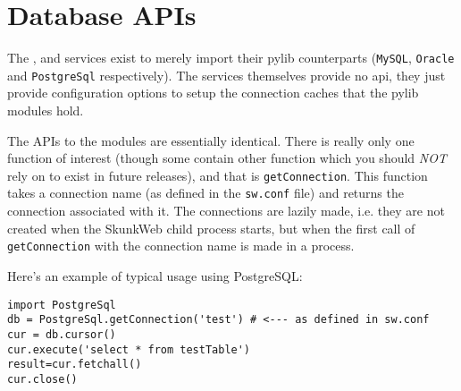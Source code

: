 \documentclass{manual}
\begin{document}
%
%
%
%
%
%
%
%
%
%
%
%
%
%
%
%
%
%
%
\appendix


\chapter{Database APIs}
\label{Database APIs}

The ,  and 
services exist to merely import their pylib counterparts
(\texttt{MySQL}, \texttt{Oracle} and \texttt{PostgreSql}
respectively).  The services themselves provide no api, they just
provide configuration options to setup the connection caches that the
pylib modules hold.  

The APIs to the modules are essentially identical.  There is really
only one function of interest (though some contain other function
which you should \emph{NOT} rely on to exist in future releases), and
that is \texttt{getConnection}.  This function takes a connection name
(as defined in the \texttt{sw.conf} file) and returns the connection
associated with it.  The connections are lazily made, i.e. they are
not created when the SkunkWeb child process starts, but when the first
call of \texttt{getConnection} with the connection name is made in a
process.

Here's an example of typical usage using PostgreSQL:

\begin{verbatim}
import PostgreSql
db = PostgreSql.getConnection('test') # <--- as defined in sw.conf
cur = db.cursor()
cur.execute('select * from testTable')
result=cur.fetchall()
cur.close()
\end{verbatim}

\cleardoublepage

\printindex
\end{document}
